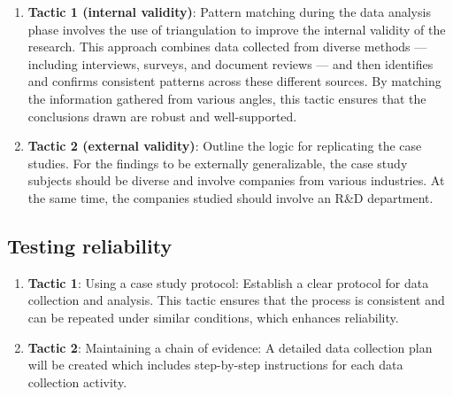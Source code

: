 \documentclass[UTF8,a4paper,AutoFakeBold,AutoFakeSlant]{article}
\begin{document}
\begin{enumerate}
    \item \textbf{Tactic 1 (internal validity)}: Pattern matching during the data analysis phase involves the use of triangulation to improve the internal validity of the research. This approach combines data collected from diverse methods — including interviews, surveys, and document reviews — and then identifies and confirms consistent patterns across these different sources. By matching the information gathered from various angles, this tactic ensures that the conclusions drawn are robust and well-supported.
    \item \textbf{Tactic 2 (external validity)}: Outline the logic for replicating the case studies. For the findings to be externally generalizable, the case study subjects should be diverse and involve companies from various industries. At the same time, the companies studied should involve an R\&D department.
\end{enumerate}


\subsection{Testing reliability}

\begin{enumerate}
    \item \textbf{Tactic 1}: Using a case study protocol: Establish a clear protocol for data collection and analysis. This tactic ensures that the process is consistent and can be repeated under similar conditions, which enhances reliability.
    \item \textbf{Tactic 2}: Maintaining a chain of evidence: A detailed data collection plan will be created which includes step-by-step instructions for each data collection activity. 
\end{enumerate}














% 
% 
% 
\end{document}
